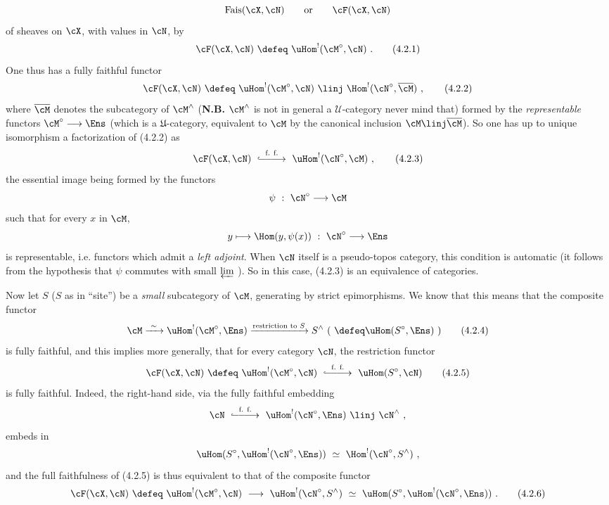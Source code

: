 \[
\mathrm{Fais}(\cX,\cN) \qquad \text{or} \qquad \cF(\cX,\cN)
\]
of sheaves on $\cX$, with values in $\cN$, by
\[
\cF(\cX,\cN) \ \defeq\ \uHom^{!}(\cM^{\circ},\cN) \ .
\tag*{(4.2.1)}
\]
One thus has a fully faithful functor
\[
\cF(\cX,\cN) \ \defeq\ \uHom^{!}(\cM^{\circ},\cN) \ \linj\ \Hom^{!}(\cN^{\circ},\overline{\cM}) \ ,
\tag*{(4.2.2)}
\]
where $\overline{\cM}$ denotes the subcategory of $\cM^{\wedge}$ (\textbf{N.B.} $\cM^{\wedge}$ is not in general a $\mathcal{U}$-category never mind that) formed by the \textit{representable} functors $\cM^{\circ}\longrightarrow\Ens$ (which is a $\mathfrak{U}$-category, equivalent to $\cM$ by the canonical inclusion $\cM \linj \overline{\cM}$). So one has up to unique isomorphism a factorization of (4.2.2) as
\[
\cF(\cX,\cN) \ \overset{\text{f. f.}}{\lhook\joinrel\relbar\joinrel\relbar\joinrel\longrightarrow}\ \uHom^{!}(\cN^{\circ},\cM) \ ,
\tag*{(4.2.3)}
\]
the essential image being formed by the functors
\[
\psi \ :\ \cN^{\circ} \longrightarrow \cM
\]
such that for every $x$ in $\cM$,
\[
y \longmapsto \Hom(y,\psi(x)) \ :\ \cN^{\circ} \longrightarrow \Ens
\]
is representable, i.e. functors which
admit a \textit{left adjoint}. When $\cN$ itself is a pseudo-topos category, this condition is automatic (it follows from the hypothesis that $\psi$ commutes with small $\varprojlim$ ). So in this case, (4.2.3) is an equivalence of categories.

Now let $S$ ($S$ as in ``site'') be a \textit{small} subcategory of $\cM$, generating by strict epimorphisms. We know that this means that the composite functor
\[
\cM \xrightarrow{\ \sim\ } \uHom^{!}(\cM^{\circ},\Ens) \xrightarrow{\text{restriction to } S} S^{\wedge} \ (\ \defeq \uHom(S^{\circ},\Ens)\ )
\tag*{(4.2.4)}
\]
is fully faithful, and this implies more generally, that for every category $\cN$, the restriction functor
\[
\cF(\cX,\cN) \ \defeq\ \uHom^{!}(\cM^{\circ},\cN) \ \overset{\text{f. f.}}{\lhook\joinrel\relbar\joinrel\relbar\joinrel\longrightarrow}\ \uHom(S^{\circ},\cN)
\tag*{(4.2.5)}
\]
is fully faithful. Indeed, the right-hand side, via the fully faithful embedding
\[
\cN \ \overset{\text{f. f.}}{\lhook\joinrel\relbar\joinrel\relbar\joinrel\longrightarrow}\ \uHom^{!}(\cN^{\circ},\Ens) \ \linj\ \cN^{\wedge} \ ,
\]
embeds in
\[
\uHom(S^{\circ},\uHom^{!}(\cN^{\circ},\Ens)) \ \simeq\ \Hom^{!}(\cN^{\circ},S^{\wedge}) \ ,
\]
and the full faithfulness of (4.2.5) is thus equivalent to that of the composite functor
\[
\cF(\cX,\cN) \ \defeq\ \uHom^{!}(\cM^{\circ},\cN) \ \longrightarrow\ \uHom^{!}(\cN^{\circ},S^{\wedge}) \ \simeq\ \uHom(S^{\circ},\uHom^{!}(\cN^{\circ},\Ens)) \ .
\tag*{(4.2.6)}
\]

